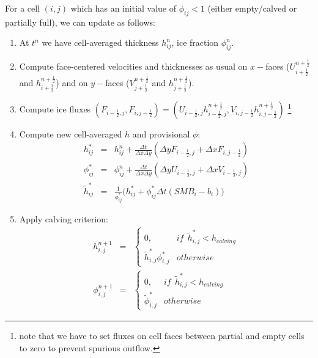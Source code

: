 \documentclass[12pt]{article}
\newcommand{\half}{\frac{1}{2}}
\begin{document}
For a cell $(i,j)$ which has an initial value of $\phi_{ij} < 1$ (either empty/calved or partially full), we can update as follows:
\begin{enumerate}
\item At $t^n$ we have cell-averaged thickness $h^n_{ij}$, ice fraction $\phi^n_{ij}$.
\item Compute face-centered velocities and thicknesses as usual on $x-$faces ($U^{n+\half}_{i+\half}$ and $h^{n+\half}_{i+\half}$) and on $y-$faces ($V^{n+\half}_{j+\half}$ and $h^{n+\half}_{j+\half}$).
\item Compute ice fluxes $(F_{i-\half,j}, F_{i, j-\half}) = (U_{i-\half,j}h^{n+\half}_{i-\half,j}, V_{i, j-\half}h^{n+\half}_{i, j-\half})$ \footnote{note that we have to set fluxes on cell faces between partial and empty cells to zero to prevent spurious outflow.}
\item Compute new cell-averaged $h$ and provisional $\phi$:
\begin{eqnarray} 
h^*_{ij} & = & h^n_{ij} + \frac{\Delta t}{\Delta x \Delta y}  (\Delta y F_{i-\half,j} + \Delta x F_{i,j-\half}) \\
\phi^*_{ij} & = & \phi^n_{ij} + \frac{\Delta t}{\Delta x \Delta y}(\Delta y U_{i-\half,j} + \Delta x V_{i-\half,j})  \nonumber \\
\tilde{h}^*_{ij} & = & \frac{1}{\phi^*_{ij}} \bigl( h^*_{ij} + \phi^*_{ij}\Delta t (SMB_i - b_i) \bigr) 
\end{eqnarray}

\item Apply calving criterion:
\begin{eqnarray}
h^{n+1}_{i,j} & = & \begin{cases}
0, & if \ \  \tilde{h}^*_{i,j} < h_{calving} \\
 \tilde{h}^*_{i,j}\phi^{*}_{i,j} & otherwise 
\end{cases} 
\label{eqn:calvingLaw2D} \\
\phi^{n+1}_{i,j} & = & \begin{cases}
0, & if \ \  \tilde{h}^*_{i,j} < h_{calving} \\
 \tilde{\phi}^*_{i,j} & otherwise \nonumber
\end{cases} 
\end{eqnarray}

\end{enumerate}
\end{document}
